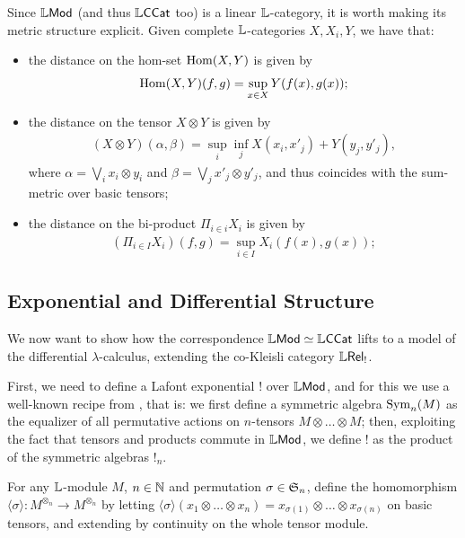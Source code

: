 Since $\mathbb{L}\mathsf{Mod}$ (and thus $\mathbb{L}\mathsf{CCat}$ too) is a linear $\mathbb{L}$-category, it is worth making its metric structure explicit. Given complete $\mathbb{L}$-categories $X,X_{i},Y$, we have that:
\begin{itemize} 
\item the distance on the hom-set $\mathrm{Hom}(X,Y)$ is given by 
\begin{align}
\mathrm{Hom}(X,Y)(f,g)= \sup_{x\in X}Y(f(x),g(x));
\end{align}
\item the distance on the tensor $X\otimes Y$ is given by
\begin{align}
(X\otimes Y)(\alpha, \beta)=
\sup_{i}\inf_{j}X(x_{i},x'_{j})+Y(y_{j},y'_{j}),
\end{align}
where $\alpha=\bigvee_{i}x_{i}\otimes y_{i}$ and 
$\beta=\bigvee_{j}x'_{j}\otimes y'_{j}$, 
and thus coincides with the sum-metric over basic tensors;
\item the distance on the bi-product $\Pi_{i\in i}X_{i}$ is given by
\begin{align}
(\Pi_{i\in I}X_{i})(f,g)= \sup_{i\in I}X_{i}(f(x),g(x));
\end{align}

\end{itemize}







\subsection{Exponential and Differential Structure}


We now want to show how the correspondence $\mathbb{L}\mathsf{Mod}\simeq \mathbb{L}\mathsf{CCat}$ lifts to a model of the differential $\lambda$-calculus, extending the co-Kleisli category $\mathbb{L} \mathsf{Rel}_{!}$. 

First, we need to define a Lafont exponential $!$ over $\mathbb{L}\mathsf{Mod}$, and for this we use a well-known recipe from \cite{Mellies, Weight}, that is: we first define a symmetric algebra $\mathrm{Sym}_{n}(M)$ as the equalizer of all permutative actions on $n$-tensors $M\otimes \dots \otimes M$; then, exploiting the fact that tensors and products commute in $\mathbb{L}\mathsf{Mod}$, we define $!$ as the product of the symmetric algebras $!_{n}$.  

For any $\mathbb{L}$-module $M$, $n\in \mathbb{N}$ and permutation $\sigma\in \mathfrak{S}_{n}$, define the homomorphism $\langle \sigma\rangle: M^{\otimes_{n}}\to M^{\otimes_{n}}$ by letting 
$\langle\sigma\rangle (x_{1}\otimes \dots \otimes x_{n})=x_{\sigma(1)}\otimes \dots \otimes x_{\sigma(n)}$ on basic tensors, and extending by continuity on the whole tensor module. 


